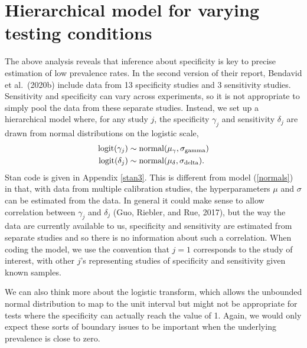 \documentclass[11pt]{article}
\begin{document}
\section{Hierarchical model for varying testing conditions}\label{model2}
The above analysis reveals that inference about specificity is key to precise estimation of low prevalence rates.  In the second version of their report, Bendavid et al.\ (2020b) include data from 13 specificity studies and 3 sensitivity studies.  Sensitivity and specificity can vary across experiments, so it is not appropriate to simply pool the data from these separate studies.  Instead, we set up a hierarchical model where, for any study $j$, the specificity $\gamma_j$ and sensitivity $\delta_j$ are drawn from normal distributions on the logistic scale,
\begin{align*}
  \mbox{logit}(\gamma_j) & \sim \mbox{normal}(\mu_{\gamma}, \sigma_{\rm gamma})\\
 \mbox{logit}(\delta_j) & \sim \mbox{normal}(\mu_{\delta}, \sigma_{\rm delta}).
\end{align*}
Stan code is given in Appendix \ref{stan3}.
This is different from model (\ref{normals}) in that, with data from multiple calibration studies, the hyperparameters $\mu$ and $\sigma$ can be estimated from the data.  In general it could make sense to allow correlation between $\gamma_j$ and $\delta_j$ (Guo, Riebler, and Rue, 2017), but the way the data are currently available to us, specificity and sensitivity are estimated from separate studies and so there is no information about such a correlation.  When coding the model, we use the convention that $j=1$ corresponds to the study of interest, with other $j$'s representing studies of specificity and sensitivity given known samples.

We can also think more about the logistic transform, which allows the unbounded normal distribution to map to the unit interval but might not be appropriate for tests where the specificity can actually reach the value of 1.  Again, we would only expect these sorts of boundary issues to be important when the underlying prevalence is close to zero.
\end{document}
